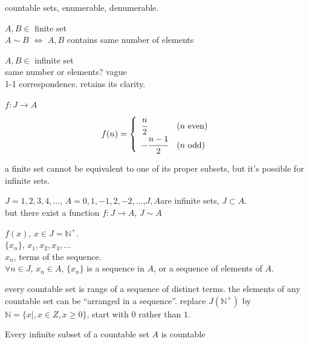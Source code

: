 countable sets, enumerable, denumerable.

$A, B \in$ finite set\\
$A\sim B$ $\Longleftrightarrow$ $A, B$ contains same number of elements

$A, B \in$ infinite set\\
same number or elements? vague\\
1-1 correspondence. retains its clarity.

\begin{newexample}
    $f:J\rightarrow A$
    \begin{equation*}
        f(n) = \left\{
        \begin{array}{ll}
            \cfrac{n}{2}    & (n \text{  even}) \\
            -\cfrac{n-1}{2} & (n \text{  odd})
        \end{array}
        \right.
    \end{equation*}
\end{newexample}

\begin{myremark}
    a finite set cannot be equivalent to one of its proper subsets, but it's possible for infinite sets.
\end{myremark}

$J = 1,2,3,4,...$, $A = 0,1,-1,2,-2,...$,$J, A$are infinite sets, $J \subset A$.\\
but there exist a function $f:J\rightarrow A$, $J \sim A$

\begin{mydef}
    \label{mydef:2.7}
    $f(x)$, $x\in J = \mathbb{N}^+$.\\
    $\{x_n\}$, $x_1,x_2,x_3,...$\\
    $x_n$, terms of the sequence.\\
    $\forall n\in J$, $x_n\in A$, $\{x_n\}$ is a sequence in $A$, or a sequence of elements of $A$.
\end{mydef}

every countable set is range of a sequence of distinct terms.
the elements of any countable set can be ``arranged in a sequence''.
replace $J(\mathbb{N}^+)$ by $\mathbb{N} = \{x|, x\in Z,x \geq 0\}$, start with $0$ rather than $1$.

\begin{thm}
    \label{thm:2.8}
    Every infinite subset of a countable set $A$ is countable
\end{thm}

